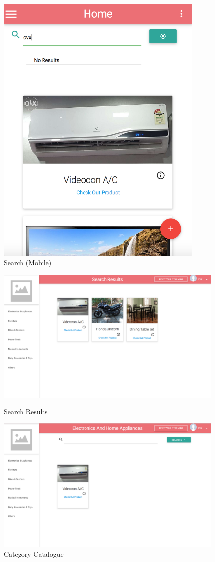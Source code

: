 \documentclass[11pt]{report}
\begin{document}
    \begin{figure}[h]
  \centering
    \includegraphics[width=4in]{search_mobile.png} 
	\caption{Search (Mobile)}
	\end{figure}
    \begin{figure}[h]
  \centering
    \includegraphics[width=6in]{searchresults.png} 
	\caption{Search Results}
\vspace{0.5in}
  \centering
    \includegraphics[width=6in]{category.png} 
	\caption{Category Catalogue}
	\end{figure}
	
\end{document}
